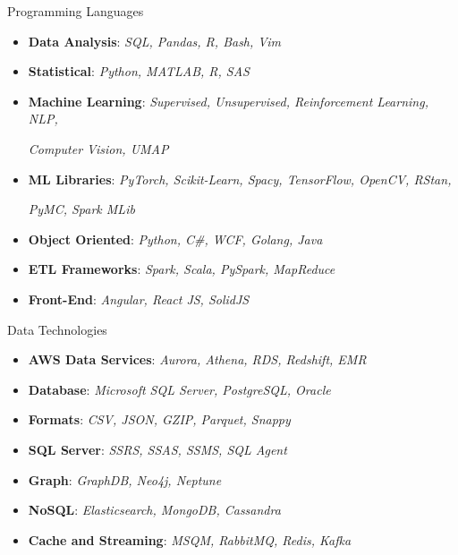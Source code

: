 
\Technology
{Programming Languages}
{\faCode}
{\begin{itemize}
    \item \textbf{Data Analysis}:
      \emph{SQL, Pandas, R, Bash, Vim}
    \item \textbf{Statistical}:
      \emph{Python, MATLAB, R, SAS}
    \item \textbf{Machine Learning}:
      \emph{Supervised, Unsupervised, Reinforcement Learning, NLP,}
        \newline \strut\hspace*{0.25 in}
        \emph{Computer Vision, UMAP}
    \item \textbf{ML Libraries}:
      \emph{PyTorch, Scikit-Learn, Spacy, TensorFlow, OpenCV, RStan,}
        \newline \strut\hspace*{0.25 in}
        \emph{PyMC, Spark MLib}
    \item \textbf{Object Oriented}:
      \emph{Python, C\#, WCF, Golang, Java}
    \item \textbf{ETL Frameworks}:
      \emph{Spark, Scala, PySpark, MapReduce}
    \item \textbf{Front-End}:
      \emph{Angular, React JS, SolidJS}
\end{itemize}}

\vspace*{0.01 in}

\Technology
{Data Technologies}
{\faDatabase}
{\begin{itemize}
    \item \textbf{AWS Data Services}:
      \emph{Aurora, Athena, RDS, Redshift, EMR}
    \item \textbf{Database}:
      \emph{Microsoft SQL Server, PostgreSQL, Oracle}
    \item \textbf{Formats}:
      \emph{CSV, JSON, GZIP, Parquet, Snappy}
    \item \textbf{SQL Server}:
      \emph{SSRS, SSAS, SSMS, SQL Agent}
    \item \textbf{Graph}:
      \emph{GraphDB, Neo4j, Neptune}
    \item \textbf{NoSQL}:
      \emph{Elasticsearch, MongoDB, Cassandra}
    \item \textbf{Cache and Streaming}:
      \emph{MSQM, RabbitMQ, Redis, Kafka}
\end{itemize}}

\vspace*{0.01 in}

